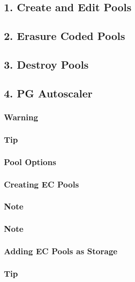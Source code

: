 \subsection{1. Create and Edit Pools}

\subsection{2. Erasure Coded Pools}

\subsection{3. Destroy Pools}

\subsection{4. PG Autoscaler}

\subsubsection{Warning}

\subsubsection{Tip}

\subsubsection{Pool Options}

\subsubsection{Creating EC Pools}

\subsubsection{Note}

\subsubsection{Note}

\subsubsection{Adding EC Pools as Storage}

\subsubsection{Tip}

